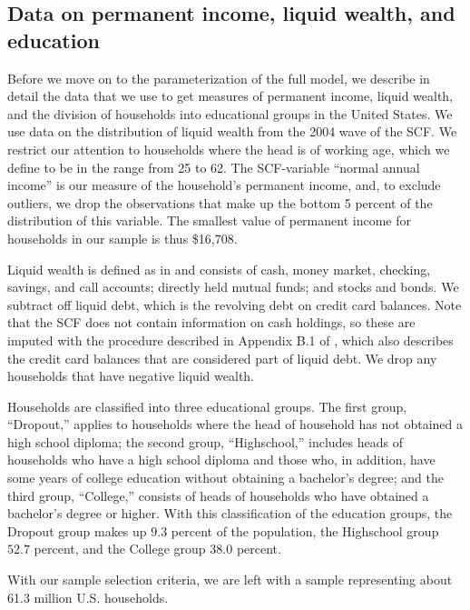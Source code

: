 \documentclass[\econtexRoot/HAFiscal]{subfiles}
\begin{document}
 

\hypertarget{data-on-permanent-income-liquid-wealth-and-education}{}\par\subsection{Data on permanent income, liquid wealth, and education}
\notinsubfile{\label{sec:SCFdata}}

Before we move on to the parameterization of the full model, we describe in detail the data that we use to get measures of permanent income, liquid wealth, and the division of households into educational groups in the United States.
We use data on the distribution of liquid wealth from the 2004 wave of the SCF.
We restrict our attention to households where the head is of working age, which we define to be in the range from 25 to 62.
The SCF-variable ``normal annual income'' is our measure of the household's permanent income, and, to exclude outliers, we drop the observations that make up the bottom 5 percent of the distribution of this variable.
The smallest value of permanent income for households in our sample is thus \$16,708.


Liquid wealth is defined as in \cite{kaplan2014model} and consists of cash, money market, checking, savings, and call accounts; directly held mutual funds; and stocks and bonds.
We subtract off liquid debt, which is the revolving debt on credit card balances.
Note that the SCF does not contain information on cash holdings, so these are imputed with the procedure described in Appendix B.1 of \cite{kaplan2014model}, which also describes the credit card balances that are considered part of liquid debt.
We drop any households that have negative liquid wealth.


Households are classified into three educational groups.
The first group, ``Dropout,'' applies to households where the head of household has not obtained a high school diploma; the second group, ``Highschool,'' includes heads of households who have a high school diploma and those who, in addition, have some years of college education without obtaining a bachelor's degree; and the third group, ``College,'' consists of heads of households who have obtained a bachelor's degree or higher.
With this classification of the education groups, the Dropout group makes up $9.3$ percent of the population, the Highschool group $52.7$ percent, and the College group $38.0$ percent.


With our sample selection criteria, we are left with a sample representing about 61.3 million U.S.
households.
\end{document}
